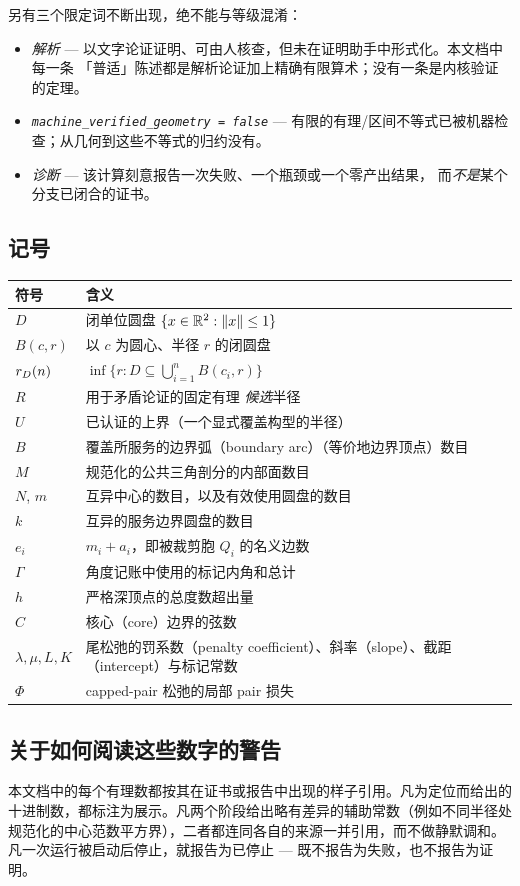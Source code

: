 另有三个限定词不断出现，绝不能与等级混淆：

\begin{itemize}[leftmargin=1.4em,itemsep=2pt]
\item \emph{解析} --- 以文字论证证明、可由人核查，但未在证明助手中形式化。本文档中每一条
「普适」陈述都是解析论证加上精确有限算术；没有一条是内核验证的定理。
\item \emph{\texttt{machine\_\allowbreak{}verified\_\allowbreak{}geometry = false}} --- 有限的有理/区间不等式已被机器检查；从几何到这些不等式的归约没有。
\item \emph{诊断} --- 该计算刻意报告一次失败、一个瓶颈或一个零产出结果，
而\emph{不是}某个分支已闭合的证书。
\end{itemize}

\subsection*{记号}

\begin{center}
\footnotesize
\begin{tabular}{@{}ll@{}}
\toprule
符号 & 含义 \\
\midrule
$D$ & 闭单位圆盘 $\{x\in\mathbb{R}^2:\|x\|\le 1\}$ \\
$B(c,r)$ & 以 $c$ 为圆心、半径 $r$ 的闭圆盘 \\
$r_{D}(n)$ & $\inf\{r: D\subseteq\bigcup_{i=1}^{n}B(c_i,r)\}$ \\
$R$ & 用于矛盾论证的固定有理 \emph{候选}半径 \\
$U$ & 已认证的上界（一个显式覆盖构型的半径） \\
$B$ & 覆盖所服务的边界弧（boundary arc）（等价地边界顶点）数目 \\
$M$ & 规范化的公共三角剖分的内部面数目 \\
$N$, $m$ & 互异中心的数目，以及有效使用圆盘的数目 \\
$k$ & 互异的服务边界圆盘的数目 \\
$e_i$ & $m_i+a_i$，即被裁剪胞 $Q_i$ 的名义边数 \\
$\Gamma$ & 角度记账中使用的标记内角和总计 \\
$h$ & 严格深顶点的总度数超出量 \\
$C$ & 核心（core）边界的弦数 \\
$\lambda,\mu,L,K$ & 尾松弛的罚系数（penalty coefficient）、斜率（slope）、截距（intercept）与标记常数 \\
$\Phi$ & capped-pair 松弛的局部 pair 损失 \\
\bottomrule
\end{tabular}
\end{center}

\subsection*{关于如何阅读这些数字的警告}

本文档中的每个有理数都按其在证书或报告中出现的样子引用。凡为定位而给出的
十进制数，都标注为展示。凡两个阶段给出略有差异的辅助常数（例如不同半径处
规范化的中心范数平方界），二者都连同各自的来源一并引用，而不做静默调和。
凡一次运行被启动后停止，就报告为已停止 --- 既不报告为失败，也不报告为证明。
